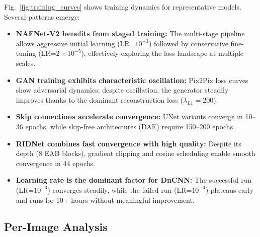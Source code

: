 Fig.~\ref{fig:training_curves} shows training dynamics for representative models. Several patterns emerge:
\begin{itemize}
    \item \textbf{NAFNet-V2 benefits from staged training:} The multi-stage pipeline allows aggressive initial learning (LR=$10^{-3}$) followed by conservative fine-tuning (LR=$2 \times 10^{-5}$), effectively exploring the loss landscape at multiple scales.
    \item \textbf{GAN training exhibits characteristic oscillation:} Pix2Pix loss curves show adversarial dynamics; despite oscillation, the generator steadily improves thanks to the dominant reconstruction loss ($\lambda_{L1} = 200$).
    \item \textbf{Skip connections accelerate convergence:} UNet variants converge in 10--36 epochs, while skip-free architectures (DAE) require 150--200 epochs.
    \item \textbf{RIDNet combines fast convergence with high quality:} Despite its depth (8 EAB blocks), gradient clipping and cosine scheduling enable smooth convergence in 44 epochs.
    \item \textbf{Learning rate is the dominant factor for DnCNN:} The successful run (LR=$10^{-3}$) converges steadily, while the failed run (LR=$10^{-4}$) plateaus early and runs for 10+ hours without meaningful improvement.
\end{itemize}

\subsection{Per-Image Analysis}

